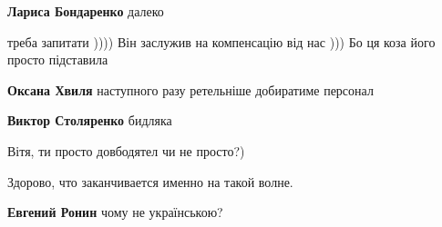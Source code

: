 \begin{itemize}
\begin{itemize}
\textbf{Лариса Бондаренко} далеко

 
треба запитати )))) Він заслужив на компенсацію від нас ))) Бо ця коза його просто підставила

 
\textbf{Оксана Хвиля} наступного разу ретельніше добиратиме персонал

 
\textbf{Виктор Столяренко} бидляка

 
Вітя, ти просто довбодятел чи не просто?)
\end{itemize}

 
Здорово, что заканчивается именно на такой волне.

\begin{itemize}
 
\textbf{Евгений Ронин} чому не українською?

 

\end{itemize}
\end{itemize}
